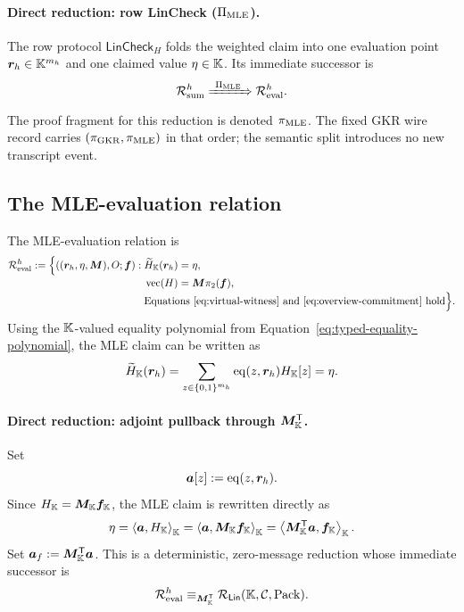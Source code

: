 \paragraph{Direct reduction: row LinCheck ($\Pi_{\rm MLE}$).}
The row protocol $\mathsf{LinCheck}_H$ folds the weighted claim into one
evaluation point $\bm r_h\in\mathbb K^{m_h}$ and one claimed value $\eta\in\mathbb K$.
Its immediate successor is
\begin{equation}
 \mathcal R_{\rm sum}^{h}
 \xRightarrow{\ \Pi_{\rm MLE}\ }
 \mathcal R_{\rm eval}^{h}.
 \label{eq:edge-sum-eval}
\end{equation}
The proof fragment for this reduction is denoted
$\pi_{\rm MLE}$.  The fixed GKR wire record carries
$(\pi_{\rm GKR},\pi_{\rm MLE})$ in that order; the semantic
split introduces no new transcript event.

\subsection{The MLE-evaluation relation}

The MLE-evaluation relation is
\begin{align}
 \mathcal R_{\rm eval}^{h}:=
 \Bigl\{((\bm r_h,\eta,\bm M),O;\bm f):\;&
  \widetilde H_{\mathbb K}(\bm r_h)=\eta,\notag\\[-2pt]
 &\operatorname{vec}(H)=\bm M\pi_2(\bm f),\notag\\[-2pt]
 &\text{Equations~\eqref{eq:virtual-witness} and
   \eqref{eq:overview-commitment} hold}
 \Bigr\}.
 \label{eq:rel-eval-h}
\end{align}
Using the $\mathbb K$-valued equality polynomial from
Equation~\eqref{eq:typed-equality-polynomial}, the MLE claim can be written as
\begin{equation}
 \widetilde H_{\mathbb K}(\bm r_h)
 =\sum_{z\in\{0,1\}^{m_h}}
   \operatorname{eq}(z,\bm r_h)H_{\mathbb K}[z]
 =\eta.
 \label{eq:virtual-mle-expansion}
\end{equation}

\paragraph{Direct reduction: adjoint pullback through
$\bm M_{\mathbb K}^{\mathsf T}$.}
Set
\begin{equation}
 \bm a[z]:=\operatorname{eq}(z,\bm r_h).
 \label{eq:virtual-adjoint-coefficient}
\end{equation}
Since $H_{\mathbb K}=\bm M_{\mathbb K}\bm f_{\mathbb K}$, the MLE claim is rewritten directly as
\begin{equation}
 \eta
 =\left\langle\bm a,H_{\mathbb K}\right\rangle_{\mathbb K}
 =\left\langle\bm a,\bm M_{\mathbb K}\bm f_{\mathbb K}\right\rangle_{\mathbb K}
 =\left\langle\bm M_{\mathbb K}^{\mathsf T}\bm a,
                 \bm f_{\mathbb K}\right\rangle_{\mathbb K}.
 \label{eq:virtual-adjoint-rewrite}
\end{equation}
Set $\bm a_f:=\bm M_{\mathbb K}^{\mathsf T}\bm a$.  This is a deterministic,
zero-message reduction whose immediate successor is
\begin{equation}
 \mathcal R_{\rm eval}^{h}
 \equiv_{\bm M_{\mathbb K}^{\mathsf T}}
 \mathcal R_{\mathsf{Lin}}(\mathbb K,\mathcal C,\operatorname{Pack}).
 \label{eq:edge-eval-lin}
\end{equation}

